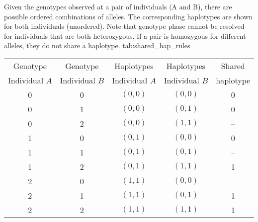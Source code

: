 

\begin{table}[!htb]
{Given the  genotypes observed at a pair of individuals (A and B), there are  possible ordered combinations of alleles.
The corresponding haplotypes are shown for both individuals (unordered).
Note that genotype phase cannot be resolved for individuals that are both heterozygous.
If a pair is homozygous for different alleles, they do not share a haplotype.}
{tab:shared_hap_rules}
\centering
\begin{tabular}{ccccc}
\toprule
Genotype & Genotype &  Haplotypes & Haplotypes & Shared  \\
Individual $A$ & Individual $B$ &  Individual $A$ & Individual $B$ & haplotype  \\
\midrule
0  &  0  &  $(0,0)$  &  $(0,0)$  &  0  \\
0  &  1  &  $(0,0)$  &  $(0,1)$  &  0  \\
0  &  2  &  $(0,0)$  &  $(1,1)$  &  -- \\
1  &  0  &  $(0,1)$  &  $(0,0)$  &  0  \\
1  &  1  &  $(0,1)$  &  $(0,1)$  &  -- \\
1  &  2  &  $(0,1)$  &  $(1,1)$  &  1  \\
2  &  0  &  $(1,1)$  &  $(0,0)$  &  -- \\
2  &  1  &  $(1,1)$  &  $(0,1)$  &  1  \\
2  &  2  &  $(1,1)$  &  $(1,1)$  &  1  \\
\bottomrule
\end{tabular}
\end{table}
